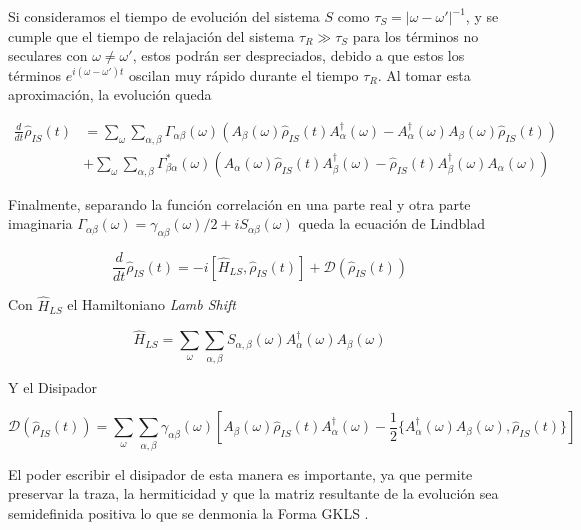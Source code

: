 Si consideramos el tiempo de evolución del sistema $S$ como $\tau_{S}=|\omega-\omega'|^{-1}$, y se cumple que el tiempo de relajación del sistema $\tau_{R}\gg \tau_{S}$ para los términos no seculares con $\omega \neq \omega'$, estos podrán ser despreciados, debido a que estos los términos $e^{i(\omega-\omega')t}$ oscilan muy rápido durante el tiempo $\tau_{R}$. Al tomar esta aproximación, la evolución queda

\begin{align*}
    \frac{d}{dt}\hat{\rho}_{IS}(t) & = \sum_{\omega}\sum_{\alpha,\beta} \Gamma_{\alpha \beta}(\omega)\left(A_{\beta}(\omega)\hat{\rho}_{IS}(t)A^{\dagger}_{\alpha}(\omega) - A^{\dagger}_{\alpha}(\omega)A_{\beta}(\omega) \hat{\rho}_{IS}(t) \right) \\
    & + \sum_{\omega}\sum_{\alpha,\beta} \Gamma^{*}_{\beta \alpha}(\omega) \left(A_{\alpha}(\omega)\hat{\rho}_{IS}(t)A^{\dagger}_{\beta}(\omega) - \hat{\rho}_{IS}(t)A^{\dagger}_{\beta}(\omega)A_{\alpha}(\omega) \right)
\end{align*}

Finalmente, separando la función correlación en una parte real y otra parte imaginaria $\Gamma_{\alpha \beta}(\omega) = \gamma_{\alpha \beta}(\omega)/2 + iS_{\alpha \beta}(\omega)$ queda la ecuación de Lindblad 

\begin{equation}
    \frac{d}{dt} \hat{\rho}_{IS}(t) = -i[\hat{H}_{LS},\hat{\rho}_{IS}(t)] + \mathcal{D}(\hat{\rho}_{IS}(t))
    \label{seclindbladfinal}
\end{equation}

Con $\hat{H}_{LS}$ el Hamiltoniano \textit{Lamb Shift}

\begin{equation*}
    \hat{H}_{LS} = \sum_{\omega} \sum_{\alpha,\beta} S_{\alpha,\beta}(\omega)A^{\dagger}_{\alpha}(\omega)A_{\beta}(\omega) 
\end{equation*}

Y el Disipador

\begin{equation*}
    \mathcal{D}(\hat{\rho}_{IS}(t)) = \sum_{\omega}\sum_{\alpha,\beta} \gamma_{\alpha \beta}(\omega) \left[ A_{\beta}(\omega)\hat{\rho}_{IS}(t)A^{\dagger}_{\alpha}(\omega) - \frac{1}{2}\{A^{\dagger}_{\alpha}(\omega)A_{\beta}(\omega), \hat{\rho}_{IS}(t)  \} \right]
\end{equation*}

El poder escribir el disipador de esta manera es importante, ya que permite preservar la traza, la hermiticidad y que la matriz resultante de la evolución sea semidefinida positiva lo que se denmonia la Forma GKLS \cite{manzano2020short}.


